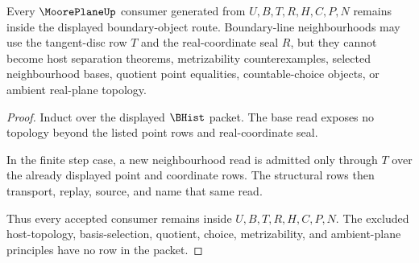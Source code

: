 \begin{theorem}
\label{thm:moore-plane-nonescape}
Every $\MoorePlaneUp$ consumer generated from $U,B,T,R,H,C,P,N$ remains inside the displayed boundary-object route. Boundary-line neighbourhoods may use the tangent-disc row $T$ and the real-coordinate seal $R$, but they cannot become host separation theorems, metrizability counterexamples, selected neighbourhood bases, quotient point equalities, countable-choice objects, or ambient real-plane topology.
\end{theorem}
\begin{proof}
Induct over the displayed $\BHist$ packet. The base read exposes no topology beyond the listed point rows and real-coordinate seal.

In the finite step case, a new neighbourhood read is admitted only through $T$ over the already displayed point and coordinate rows. The structural rows then transport, replay, source, and name that same read.

Thus every accepted consumer remains inside $U,B,T,R,H,C,P,N$. The excluded host-topology, basis-selection, quotient, choice, metrizability, and ambient-plane principles have no row in the packet.
\end{proof}


\begin{closurestatus}{\MoorePlaneUp}
  \theoryclosure{\seedClosure}
  \formalstatus{\unformalizedV}
\end{closurestatus}
